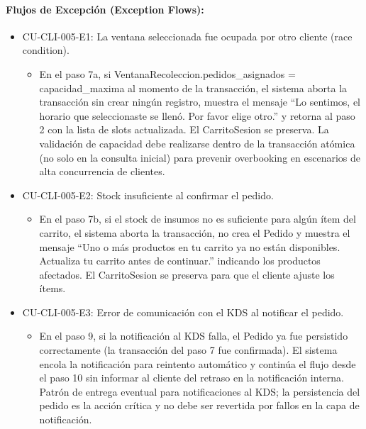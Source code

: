 \paragraph{Flujos de Excepción (Exception Flows):}
\begin{itemize}
    \item CU-CLI-005-E1: La ventana seleccionada fue ocupada por otro cliente (race condition).
    \begin{itemize}
        \item En el paso 7a, si VentanaRecoleccion.pedidos\_asignados = capacidad\_maxima al momento de la transacción, el sistema aborta la transacción sin crear ningún registro, muestra el mensaje ``Lo sentimos, el horario que seleccionaste se llenó. Por favor elige otro.'' y retorna al paso 2 con la lista de slots actualizada. El CarritoSesion se preserva. La validación de capacidad debe realizarse dentro de la transacción atómica (no solo en la consulta inicial) para prevenir overbooking en escenarios de alta concurrencia de clientes.
    \end{itemize}
    \item CU-CLI-005-E2: Stock insuficiente al confirmar el pedido.
    \begin{itemize}
        \item En el paso 7b, si el stock de insumos no es suficiente para algún ítem del carrito, el sistema aborta la transacción, no crea el Pedido y muestra el mensaje ``Uno o más productos en tu carrito ya no están disponibles. Actualiza tu carrito antes de continuar.'' indicando los productos afectados. El CarritoSesion se preserva para que el cliente ajuste los ítems.
    \end{itemize}
    \item CU-CLI-005-E3: Error de comunicación con el KDS al notificar el pedido.
    \begin{itemize}
        \item En el paso 9, si la notificación al KDS falla, el Pedido ya fue persistido correctamente (la transacción del paso 7 fue confirmada). El sistema encola la notificación para reintento automático y continúa el flujo desde el paso 10 sin informar al cliente del retraso en la notificación interna. Patrón de entrega eventual para notificaciones al KDS; la persistencia del pedido es la acción crítica y no debe ser revertida por fallos en la capa de notificación.
    \end{itemize}
\end{itemize}


